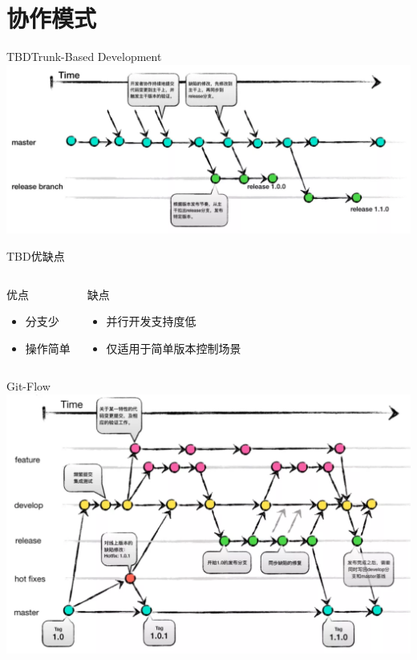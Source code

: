 \section{协作模式}

\begin{frame}{TBD}{Trunk-Based Development}
    \centering
    \includegraphics[height=30ex,width=48ex]{figures/tbd.png}
\end{frame}

\begin{frame}[t]{TBD}{优缺点}
    \begin{columns}[onlytextwidth]
        \begin{alertblock}{优点}
            \begin{itemize}
                \item 分支少
                \item 操作简单
            \end{itemize}
        \end{alertblock}
        \begin{exampleblock}{缺点}
            \begin{itemize}
                \item 并行开发支持度低
                \item 仅适用于简单版本控制场景
            \end{itemize}
        \end{exampleblock}
    \end{columns}
\end{frame}

\begin{frame}{Git-Flow}
    \centering
    \includegraphics[height=30ex,width=48ex]{figures/git-flow.png}
\end{frame}

